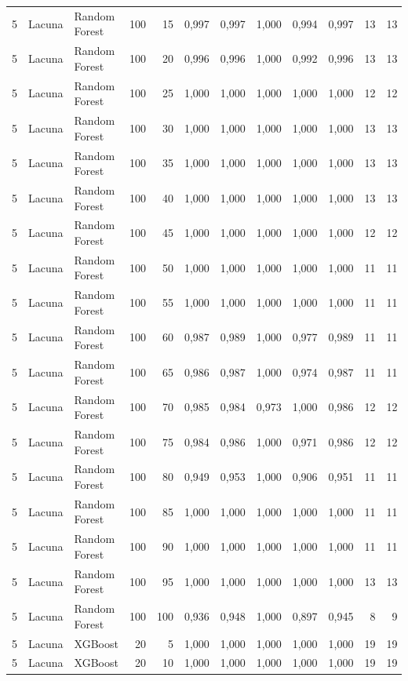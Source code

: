 \begin{longtable}{@{}rllrrrrrrrrr@{}}
5 & Lacuna & Random Forest & 100 & 15 & 0,997 & 0,997 & 1,000 & 0,994 & 0,997 & 13 & 13 \\
5 & Lacuna & Random Forest & 100 & 20 & 0,996 & 0,996 & 1,000 & 0,992 & 0,996 & 13 & 13 \\
5 & Lacuna & Random Forest & 100 & 25 & 1,000 & 1,000 & 1,000 & 1,000 & 1,000 & 12 & 12 \\
5 & Lacuna & Random Forest & 100 & 30 & 1,000 & 1,000 & 1,000 & 1,000 & 1,000 & 13 & 13 \\
5 & Lacuna & Random Forest & 100 & 35 & 1,000 & 1,000 & 1,000 & 1,000 & 1,000 & 13 & 13 \\
5 & Lacuna & Random Forest & 100 & 40 & 1,000 & 1,000 & 1,000 & 1,000 & 1,000 & 13 & 13 \\
5 & Lacuna & Random Forest & 100 & 45 & 1,000 & 1,000 & 1,000 & 1,000 & 1,000 & 12 & 12 \\
5 & Lacuna & Random Forest & 100 & 50 & 1,000 & 1,000 & 1,000 & 1,000 & 1,000 & 11 & 11 \\
5 & Lacuna & Random Forest & 100 & 55 & 1,000 & 1,000 & 1,000 & 1,000 & 1,000 & 11 & 11 \\
5 & Lacuna & Random Forest & 100 & 60 & 0,987 & 0,989 & 1,000 & 0,977 & 0,989 & 11 & 11 \\
5 & Lacuna & Random Forest & 100 & 65 & 0,986 & 0,987 & 1,000 & 0,974 & 0,987 & 11 & 11 \\
5 & Lacuna & Random Forest & 100 & 70 & 0,985 & 0,984 & 0,973 & 1,000 & 0,986 & 12 & 12 \\
5 & Lacuna & Random Forest & 100 & 75 & 0,984 & 0,986 & 1,000 & 0,971 & 0,986 & 12 & 12 \\
5 & Lacuna & Random Forest & 100 & 80 & 0,949 & 0,953 & 1,000 & 0,906 & 0,951 & 11 & 11 \\
5 & Lacuna & Random Forest & 100 & 85 & 1,000 & 1,000 & 1,000 & 1,000 & 1,000 & 11 & 11 \\
5 & Lacuna & Random Forest & 100 & 90 & 1,000 & 1,000 & 1,000 & 1,000 & 1,000 & 11 & 11 \\
5 & Lacuna & Random Forest & 100 & 95 & 1,000 & 1,000 & 1,000 & 1,000 & 1,000 & 13 & 13 \\
5 & Lacuna & Random Forest & 100 & 100 & 0,936 & 0,948 & 1,000 & 0,897 & 0,945 & 8 & 9 \\
5 & Lacuna & XGBoost & 20 & 5 & 1,000 & 1,000 & 1,000 & 1,000 & 1,000 & 19 & 19 \\
5 & Lacuna & XGBoost & 20 & 10 & 1,000 & 1,000 & 1,000 & 1,000 & 1,000 & 19 & 19 \\

\end{longtable}
